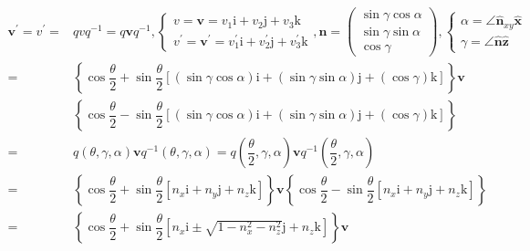\documentclass[
]{book}
\theoremstyle{definition}
\theoremstyle{definition}
\theoremstyle{definition}
\theoremstyle{definition}
\theoremstyle{remark}
\begin{document}
\[
\begin{aligned}
\boldsymbol{v}^{\prime}=v^{\prime}= & qvq^{-1}=q\boldsymbol{v}q^{-1},\begin{cases}
v=\boldsymbol{v}=v_{{\scriptscriptstyle 1}}\mathrm{i}+v_{{\scriptscriptstyle 2}}\mathrm{j}+v_{{\scriptscriptstyle 3}}\mathrm{k}\\
v^{\prime}=\boldsymbol{v}^{\prime}=v_{{\scriptscriptstyle 1}}^{\prime}\mathrm{i}+v_{{\scriptscriptstyle 2}}^{\prime}\mathrm{j}+v_{{\scriptscriptstyle 3}}^{\prime}\mathrm{k}
\end{cases},\boldsymbol{n}=\begin{pmatrix}\sin\gamma\cos\alpha\\
\sin\gamma\sin\alpha\\
\cos\gamma
\end{pmatrix},\begin{cases}
\alpha=\angle\hat{\boldsymbol{n}}_{{\scriptscriptstyle xy}}\hat{\boldsymbol{x}}\\
\gamma=\angle\hat{\boldsymbol{n}}\hat{\boldsymbol{z}}
\end{cases}\\
= & \left\{ \cos\dfrac{\theta}{2}+\sin\dfrac{\theta}{2}\left[\left(\sin\gamma\cos\alpha\right)\mathrm{i}+\left(\sin\gamma\sin\alpha\right)\mathrm{j}+\left(\cos\gamma\right)\mathrm{k}\right]\right\} \boldsymbol{v}\\
 & \left\{ \cos\dfrac{\theta}{2}-\sin\dfrac{\theta}{2}\left[\left(\sin\gamma\cos\alpha\right)\mathrm{i}+\left(\sin\gamma\sin\alpha\right)\mathrm{j}+\left(\cos\gamma\right)\mathrm{k}\right]\right\} \\
= & q\left(\theta,\gamma,\alpha\right)\boldsymbol{v}q^{-1}\left(\theta,\gamma,\alpha\right)=q\left(\dfrac{\theta}{2},\gamma,\alpha\right)\boldsymbol{v}q^{-1}\left(\dfrac{\theta}{2},\gamma,\alpha\right)\\
= & \left\{ \cos\dfrac{\theta}{2}+\sin\dfrac{\theta}{2}\left[n_{{\scriptscriptstyle x}}\mathrm{i}+n_{{\scriptscriptstyle y}}\mathrm{j}+n_{{\scriptscriptstyle z}}\mathrm{k}\right]\right\} \boldsymbol{v}\left\{ \cos\dfrac{\theta}{2}-\sin\dfrac{\theta}{2}\left[n_{{\scriptscriptstyle x}}\mathrm{i}+n_{{\scriptscriptstyle y}}\mathrm{j}+n_{{\scriptscriptstyle z}}\mathrm{k}\right]\right\} \\
= & \left\{ \cos\dfrac{\theta}{2}+\sin\dfrac{\theta}{2}\left[n_{{\scriptscriptstyle x}}\mathrm{i}\pm\sqrt{1-n_{{\scriptscriptstyle x}}^{2}-n_{{\scriptscriptstyle z}}^{2}}\mathrm{j}+n_{{\scriptscriptstyle z}}\mathrm{k}\right]\right\} \boldsymbol{v}\\

\end{aligned}\]
\end{document}
